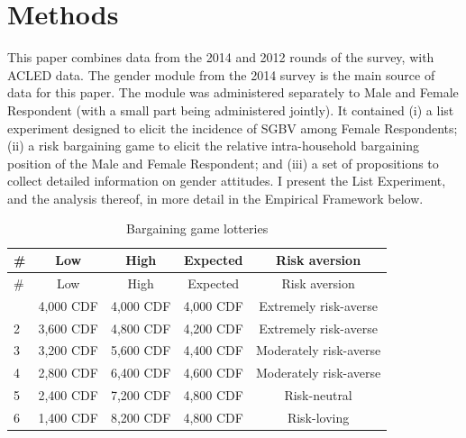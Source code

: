 \documentclass[
]{article}
\begin{document}
\section*{Methods}\label{methods}

This paper combines data from the 2014 and 2012 rounds of the survey,
with ACLED data. The gender module from the 2014 survey is the main
source of data for this paper. The module was administered separately to
Male and Female Respondent (with a small part being administered
jointly). It contained (i) a list experiment designed to elicit the
incidence of SGBV among Female Respondents; (ii) a risk bargaining game
to elicit the relative intra-household bargaining position of the Male
and Female Respondent; and (iii) a set of propositions to collect
detailed information on gender attitudes. I present the List Experiment,
and the analysis thereof, in more detail in the Empirical Framework
below.

\label{tab:bargaining}
\begin{longtable}[]{@{}lcccc@{}}
\caption{Bargaining game lotteries}\tabularnewline
\toprule\noalign{}
\# & Low & High & Expected & Risk aversion \\
\midrule\noalign{}
\endfirsthead
\toprule\noalign{}
\# & Low & High & Expected & Risk aversion \\
\midrule\noalign{}
\endhead
\bottomrule\noalign{}
\endlastfoot
1 & 4,000 CDF & 4,000 CDF & 4,000 CDF & Extremely risk-averse \\
2 & 3,600 CDF & 4,800 CDF & 4,200 CDF & Extremely risk-averse \\
3 & 3,200 CDF & 5,600 CDF & 4,400 CDF & Moderately risk-averse \\
4 & 2,800 CDF & 6,400 CDF & 4,600 CDF & Moderately risk-averse \\
5 & 2,400 CDF & 7,200 CDF & 4,800 CDF & Risk-neutral \\
6 & 1,400 CDF & 8,200 CDF & 4,800 CDF & Risk-loving \\
\end{longtable}
\end{document}
